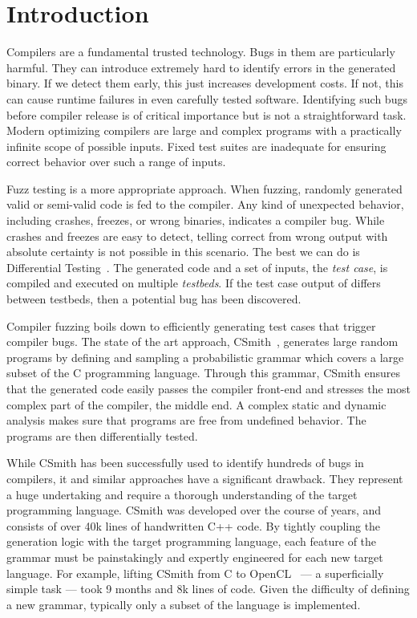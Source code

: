 \section{Introduction}\label{sec:intro}


\noindent
Compilers are a fundamental trusted technology. Bugs in them are particularly harmful. They can introduce extremely hard to identify errors in the generated binary. If we detect them early, this just increases development costs. If not, this can cause runtime failures in even carefully tested software. Identifying such bugs before compiler release is of critical importance but is not a straightforward task. Modern optimizing compilers are large and complex programs with a practically infinite scope of possible inputs. Fixed test suites are inadequate for ensuring correct behavior over such a range of inputs.

Fuzz testing is a more appropriate approach. When fuzzing, randomly generated valid or semi-valid code is fed to the compiler. Any kind of unexpected behavior, including crashes, freezes, or wrong binaries, indicates a compiler bug. While crashes and freezes are easy to detect, telling correct from wrong output with absolute certainty is not possible in this scenario. The best we can do is Differential Testing~\cite{Chen2014a,Kossatchev2005,Chen2013}. The generated code and a set of inputs, the \emph{test case}, is compiled and executed on multiple \emph{testbeds}. If the test case output of differs between testbeds, then a potential bug has been discovered.

Compiler fuzzing boils down to efficiently generating test cases that trigger compiler bugs. The state of the art approach, CSmith~\cite{Yang2011}, generates large random programs by defining and sampling a probabilistic grammar which covers a large subset of the C programming language. Through this grammar, CSmith ensures that the generated code easily passes the compiler front-end and stresses the most complex part of the compiler, the middle end. A complex static and dynamic analysis makes sure that programs are free from undefined behavior. The programs are then differentially tested.

While CSmith has been successfully used to identify hundreds of bugs in compilers, it and similar approaches have a significant drawback. They represent a huge undertaking and require a thorough understanding of the target programming language. CSmith was developed over the course of years, and consists of over 40k lines of handwritten C++ code. By tightly coupling the generation logic with the target programming language, each feature of the grammar must be painstakingly and expertly engineered for each new target language. For example, lifting CSmith from C to OpenCL~\cite{Lidbury2015a} --- a superficially simple task --- took 9 months and 8k lines of code. Given the difficulty of defining a new grammar, typically only a subset of the language is implemented.


